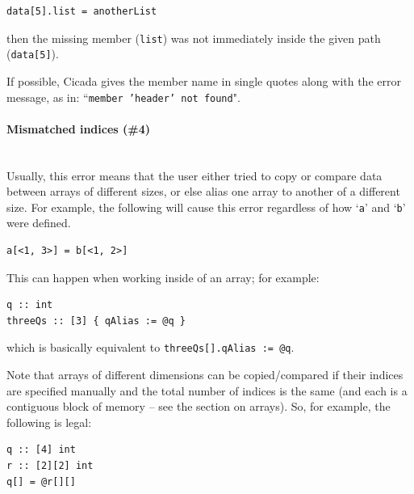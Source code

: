 \documentclass{article}
\newenvironment{code}{
       \begin{list}{}{
               \setlength{\leftmargin}{.4in}
               \setlength{\rightmargin}{0in}
               \setlength{\topsep}{.2in}
       }
       \small
       \item[] }
       { \end{list}   }
\begin{document}
\begin{code} \begin{verbatim}
data[5].list = anotherList
\end{verbatim} \end{code}

\noindent then the missing member (\verb#list#) was not immediately inside the given path (\verb#data[5]#).

If possible, Cicada gives the member name in single quotes along with the error message, as in:  ``\texttt{member 'header' not found}".\\




\paragraph{Mismatched indices (\#4)\\\\}

Usually, this error means that the user either tried to copy or compare data between arrays of different sizes, or else alias one array to another of a different size.  For example, the following will cause this error regardless of how `\verb#a#' and `\verb#b#' were defined.

\begin{code} \begin{verbatim}
a[<1, 3>] = b[<1, 2>]
\end{verbatim} \end{code}

\noindent This can happen when working inside of an array; for example:

\begin{code} \begin{verbatim}
q :: int
threeQs :: [3] { qAlias := @q }
\end{verbatim} \end{code}

\noindent which is basically equivalent to \verb#threeQs[].qAlias := @q#.

Note that arrays of different dimensions can be copied/compared if their indices are specified manually and the total number of indices is the same (and each is a contiguous block of memory -- see the section on arrays).  So, for example, the following is legal:

\begin{code} \begin{verbatim}
q :: [4] int
r :: [2][2] int
q[] = @r[][]
\end{verbatim} \end{code}
\end{document}
